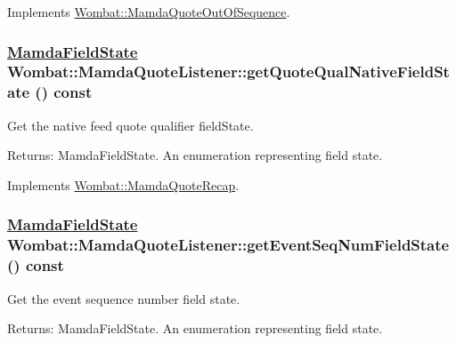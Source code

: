 Implements \hyperlink{classWombat_1_1MamdaQuoteOutOfSequence_d8ffb3eab13dd519e846dc59c387924b}{Wombat::Mamda\-Quote\-Out\-Of\-Sequence}.\hypertarget{classWombat_1_1MamdaQuoteListener_9c5a520a83919f48b66dc8989d509c4c}{
\subsubsection[getQuoteQualNativeFieldState]{\setlength{\rightskip}{0pt plus 5cm}\hyperlink{namespaceWombat_93aac974f2ab713554fd12a1fa3b7d2a}{Mamda\-Field\-State} Wombat::Mamda\-Quote\-Listener::get\-Quote\-Qual\-Native\-Field\-State () const}}
\label{classWombat_1_1MamdaQuoteListener_9c5a520a83919f48b66dc8989d509c4c}


Get the native feed quote qualifier field\-State. 

\begin{Desc}
\item[Returns:]Mamda\-Field\-State. An enumeration representing field state. \end{Desc}


Implements \hyperlink{classWombat_1_1MamdaQuoteRecap_1d5b1c7bd433ee7e444e83ec39c2de62}{Wombat::Mamda\-Quote\-Recap}.\hypertarget{classWombat_1_1MamdaQuoteListener_14657763833e473324025f3093119656}{
\subsubsection[getEventSeqNumFieldState]{\setlength{\rightskip}{0pt plus 5cm}\hyperlink{namespaceWombat_93aac974f2ab713554fd12a1fa3b7d2a}{Mamda\-Field\-State} Wombat::Mamda\-Quote\-Listener::get\-Event\-Seq\-Num\-Field\-State () const}}
\label{classWombat_1_1MamdaQuoteListener_14657763833e473324025f3093119656}


Get the event sequence number field state. 

\begin{Desc}
\item[Returns:]Mamda\-Field\-State. An enumeration representing field state. \end{Desc}


